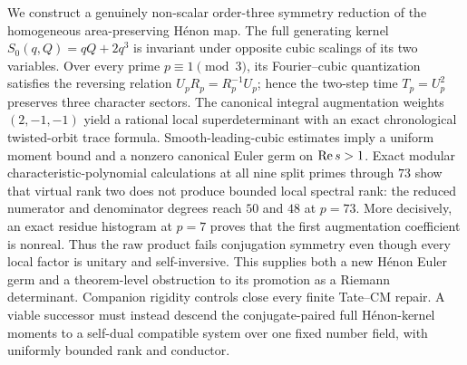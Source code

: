 We construct a genuinely non-scalar order-three symmetry reduction of the
homogeneous area-preserving H\'enon map.  The full generating kernel
$S_0(q,Q)=qQ+2q^3$ is invariant under opposite cubic scalings of its two
variables.  Over every prime $p\equiv1\pmod3$, its Fourier--cubic
quantization satisfies the reversing relation $U_pR_p=R_p^{-1}U_p$; hence
the two-step time $T_p=U_p^2$ preserves three character sectors.  The
canonical integral augmentation weights $(2,-1,-1)$ yield a rational local
superdeterminant with an exact chronological twisted-orbit trace formula.
Smooth-leading-cubic estimates imply a uniform moment bound and a nonzero
canonical Euler germ on $\operatorname{Re} s>1$.  Exact modular characteristic-polynomial
calculations at all nine split primes through $73$ show that virtual rank two does not
produce bounded local spectral rank: the reduced numerator and denominator
degrees reach $50$ and $48$ at $p=73$.  More decisively, an exact residue
histogram at $p=7$ proves that the first augmentation coefficient is nonreal.
Thus the raw product fails conjugation symmetry even though every local
factor is unitary and self-inversive.  This supplies both a new H\'enon Euler
germ and a theorem-level obstruction to its promotion as a Riemann
determinant.  Companion rigidity controls close every finite Tate--CM repair.
A viable successor must instead descend the conjugate-paired full
Hénon-kernel moments to a self-dual compatible system over one fixed number
field, with uniformly bounded rank and conductor.
